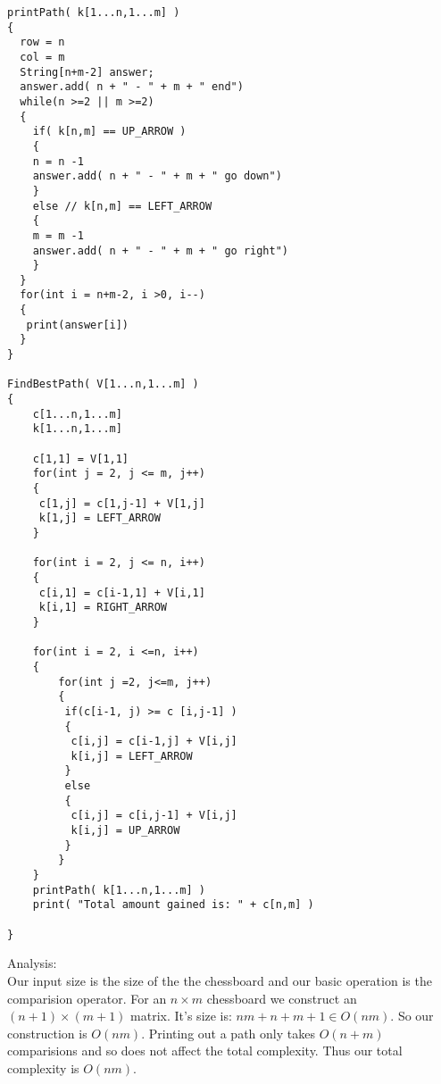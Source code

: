 \documentclass[12pt]{article}
\begin{document}
 \begin{lstlisting}
printPath( k[1...n,1...m] )
{
  row = n
  col = m
  String[n+m-2] answer;
  answer.add( n + " - " + m + " end")
  while(n >=2 || m >=2)
  {
	if( k[n,m] == UP_ARROW )
	{
	n = n -1
	answer.add( n + " - " + m + " go down")
	}
	else // k[n,m] == LEFT_ARROW
	{
	m = m -1
	answer.add( n + " - " + m + " go right")
	}
  }
  for(int i = n+m-2, i >0, i--)
  {
   print(answer[i])
  }
}

FindBestPath( V[1...n,1...m] )
{
	c[1...n,1...m]
	k[1...n,1...m]

	c[1,1] = V[1,1]
	for(int j = 2, j <= m, j++)
	{
	 c[1,j] = c[1,j-1] + V[1,j]
	 k[1,j] = LEFT_ARROW
	}
	
	for(int i = 2, j <= n, i++)
	{
	 c[i,1] = c[i-1,1] + V[i,1]
	 k[i,1] = RIGHT_ARROW
	}
	
	for(int i = 2, i <=n, i++)
	{
		for(int j =2, j<=m, j++)
		{
		 if(c[i-1, j) >= c [i,j-1] )
		 {
		  c[i,j] = c[i-1,j] + V[i,j]
		  k[i,j] = LEFT_ARROW
		 }
		 else
		 {
		  c[i,j] = c[i,j-1] + V[i,j]
		  k[i,j] = UP_ARROW
		 }
		}
	}
	printPath( k[1...n,1...m] )
	print( "Total amount gained is: " + c[n,m] )

}
\end{lstlisting}

Analysis:\\
Our input size is the size of the the chessboard and our basic operation is the comparision operator. For an $n \times m$ chessboard we construct an $(n+1) \times (m+1)$ matrix.
It's size is: $nm + n + m + 1 \in O(nm)$.  So our construction is $O(nm)$.  Printing out a path only takes $O(n+m)$ comparisions and so does not affect the total complexity.  Thus our total
complexity is $O(nm)$.
\end{document}
